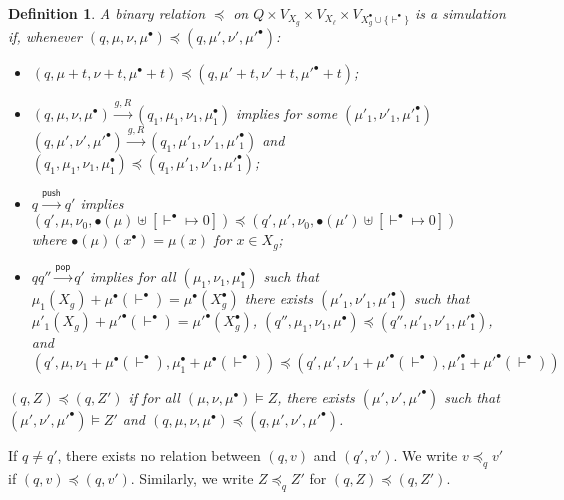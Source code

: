\documentclass{llncs}
\newtheorem{Def}{Definition}
\newcommand{\pushact}{\mathsf{push}}
\newcommand{\popact}{\mathsf{pop}}
\begin{document}
\begin{Def}
  A binary relation $\preceq$ on 
  $Q\times V_{X_g}\times V_{X_\ell}\times V_{X^\bullet_g\cup\{\vdash^\bullet\}}$ is a
  {\em simulation} if, whenever $(q,\mu,\nu,\mu^\bullet)\preceq (q,\mu',\nu',\mu'^\bullet)$:
  \begin{itemize}
    \item $(q,\mu+t,\nu+t,\mu^\bullet+t)\preceq (q,\mu'+t,\nu'+t,\mu'^\bullet+t)$;
    \item $(q,\mu,\nu,\mu^\bullet)\xrightarrow{g,R}(q_1,\mu_1,\nu_1,\mu^\bullet_1)$ implies
     for some $(\mu'_1,\nu'_1,\mu'^\bullet_1)$
      $(q,\mu',\nu',\mu'^\bullet)\xrightarrow{g,R}(q_1,\mu'_1,\nu'_1,\mu'^\bullet_1)$ and
      $(q_1,\mu_1,\nu_1,\mu^\bullet_1)\preceq(q_1,\mu'_1,\nu'_1,\mu'^\bullet_1)$;
    \item $q\xrightarrow{\pushact}q'$ implies
      $(q',\mu,\nu_0,\bullet(\mu)\uplus[\vdash^\bullet\mapsto 0])
        \preceq(q',\mu',\nu_0,\bullet(\mu')\uplus[\vdash^\bullet\mapsto 0])$\\
      \quad where $\bullet(\mu)(x^\bullet)=\mu(x)$ for $x\in X_g$;
    \item 
    $qq''\xrightarrow{\popact}q'$ implies
    for all $(\mu_1,\nu_1,\mu^\bullet_1)$ such that $\mu_1(X_g)+\mu^\bullet(\vdash^\bullet)=\mu^\bullet(X_g^\bullet)$
    there exists $(\mu'_1,\nu'_1,\mu'^\bullet_1)$ such that 
    $\mu'_1(X_g)+\mu'^\bullet(\vdash^\bullet)=\mu'^\bullet(X_g^\bullet)$,
    $(q'',\mu_1,\nu_1,\mu^\bullet)\preceq(q'',\mu'_1,\nu'_1,\mu'^\bullet_1)$,
    and $(q',\mu,\nu_1+\mu^\bullet(\vdash^\bullet),\mu^\bullet_1+\mu^\bullet(\vdash^\bullet))
    \preceq (q',\mu',\nu'_1+\mu'^\bullet(\vdash^\bullet),\mu'^\bullet_1+\mu'^\bullet(\vdash^\bullet))$
  \end{itemize}

  $(q,Z)\preceq(q,Z')$ if for all $(\mu,\nu,\mu^\bullet)\models Z$, there exists $(\mu',\nu',\mu'^\bullet)$ 
  such that $(\mu',\nu',\mu'^\bullet)\models Z'$ and $(q,\mu,\nu,\mu^\bullet)\preceq(q,\mu',\nu',\mu'^\bullet)$.

\end{Def}

If $q\not=q'$, there exists no relation between $(q,v)$ and $(q',v')$.   We write
$v\preceq_q v'$ if $(q,v)\preceq (q,v')$.   Similarly, we write $Z\preceq_q Z'$
for $(q,Z)\preceq (q,Z')$. 
\end{document}
